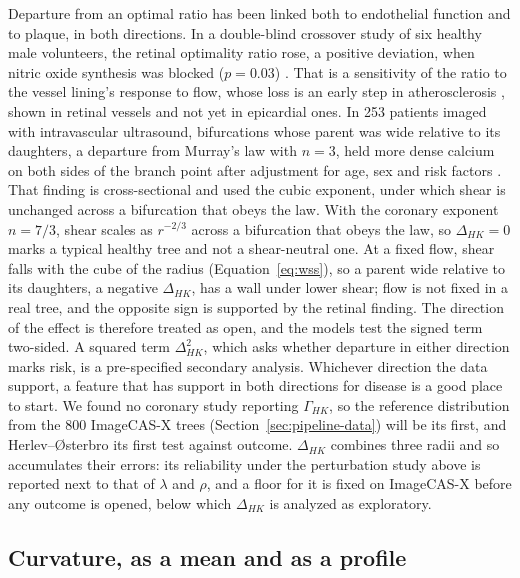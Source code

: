 Departure from an optimal ratio has been linked both to endothelial function and to plaque, in both directions.
In a double-blind crossover study of six healthy male volunteers, the retinal optimality ratio rose, a positive deviation, when nitric oxide synthesis was blocked ($p = 0.03$) \cite{witt2010optimality}.
That is a sensitivity of the ratio to the vessel lining's response to flow, whose loss is an early step in atherosclerosis \cite{chatzizisis2007ess}, shown in retinal vessels and not yet in epicardial ones.
In 253 patients imaged with intravascular ultrasound, bifurcations whose parent was wide relative to its daughters, a departure from Murray's law with $n = 3$, held more dense calcium on both sides of the branch point after adjustment for age, sex and risk factors \cite{schoenenberger2012murray}.
That finding is cross-sectional and used the cubic exponent, under which shear is unchanged across a bifurcation that obeys the law.
With the coronary exponent $n = 7/3$, shear scales as $r^{-2/3}$ across a bifurcation that obeys the law, so $\Delta_{HK} = 0$ marks a typical healthy tree and not a shear-neutral one.
At a fixed flow, shear falls with the cube of the radius (Equation~\ref{eq:wss}), so a parent wide relative to its daughters, a negative $\Delta_{HK}$, has a wall under lower shear; flow is not fixed in a real tree, and the opposite sign is supported by the retinal finding.
The direction of the effect is therefore treated as open, and the models test the signed term two-sided.
A squared term $\Delta_{HK}^2$, which asks whether departure in either direction marks risk, is a pre-specified secondary analysis.
Whichever direction the data support, a feature that has support in both directions for disease is a good place to start.
We found no coronary study reporting $\Gamma_{HK}$, so the reference distribution from the 800 ImageCAS-X trees (Section~\ref{sec:pipeline-data}) will be its first, and Herlev--{\O}sterbro its first test against outcome.
$\Delta_{HK}$ combines three radii and so accumulates their errors: its reliability under the perturbation study above is reported next to that of $\lambda$ and $\rho$, and a floor for it is fixed on ImageCAS-X before any outcome is opened, below which $\Delta_{HK}$ is analyzed as exploratory.

\subsection{Curvature, as a mean and as a profile}

